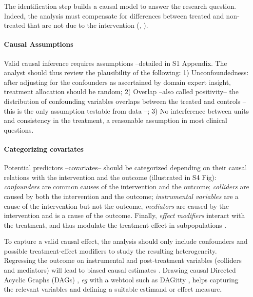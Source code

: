 \documentclass[10pt,letterpaper]{article}
\begin{document}
The identification step builds a causal model to answer the research question.
%
Indeed, the analysis must compensate for differences between
treated and non-treated that are not due to the intervention
(\cite[chapter~1]{pearl2018book},
\cite[chapter~1]{hernan2020causal}).

\paragraph{Causal Assumptions}

Valid causal inference requires assumptions  \cite{rubin2005causal} --detailed
in S1 Appendix. The analyst should thus review the
plausibility of the following: 1) Unconfoundedness: after adjusting for the
confounders as ascertained by domain expert insight, treatment allocation should
be random; 2) Overlap --also called positivity-- the distribution of confounding
variables overlaps between the treated and controls --this is the only
assumption testable from data \cite{austin2015moving}--; 3) No interference
between units and consistency in the treatment, a reasonable assumption in most
clinical questions.

\paragraph{Categorizing covariates}
%
Potential predictors --covariates-- should be categorized depending on their
causal relations with the intervention and the outcome (illustrated in
S4 Fig): \emph{confounders} are common causes of the
intervention and the outcome; \emph{colliders} are caused by both the
intervention and the outcome; \emph{instrumental variables} are a cause of the
intervention but not the outcome, \emph{mediators} are caused by the
intervention and is a cause of the outcome. Finally, \emph{effect modifiers}
interact with the treatment, and thus
modulate the treatment effect in subpopulations \cite{attia2022proposal}.

To capture a valid causal effect, the analysis should only include confounders
and possible treatment-effect modifiers to study the resulting heterogeneity.
Regressing the outcome on instrumental and post-treatment variables (colliders
and mediators) will lead to biased causal estimates
\cite{vanderweele2019principles}. Drawing causal Directed Acyclic Graphs
(DAGs) \cite{greenland1999causal}, \emph{eg} with a webtool such as DAGitty \cite{textor2011dagitty}, helps capturing the relevant
variables and defining a suitable estimand or effect measure.
\end{document}

